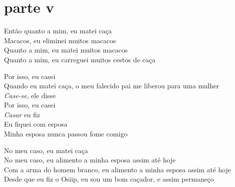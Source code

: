  
 \medskip
\section{parte v}

 \noindent Então quanto a mim, eu matei caça\\
 Macacos, eu eliminei muitos macacos\\
 Quanto a mim, eu matei muitos macacos\\
 Quanto a mim, eu carreguei muitos cestos de caça
 
 \smallskip
 \begin{center}\end{center}
 \smallskip
 
\noindent  Por isso, eu casei\\
 Quando eu matei caça, o meu falecido pai me liberou para uma mulher\\
 \textit{Case-se}, ele disse\\
 Por isso, eu casei\\
 \textit{Casar} eu fiz\\
 Eu fiquei com esposa\\
  Minha esposa nunca passou fome comigo
 
 \smallskip
 \begin{center}\end{center}
 \smallskip
 
\noindent  No meu caso, eu matei caça\\
 No meu caso, eu alimento a minha esposa assim até hoje\\
 Com a arma do homem branco, eu alimento a minha esposa assim até hoje\\
 Desde que eu fiz o Osiip, eu sou um bom caçador, e assim permaneço
 
